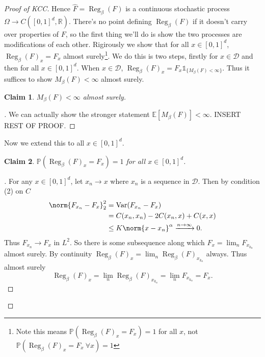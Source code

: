 \documentclass[fontsize=12pt, DIV=10]{scrreprt}
\newtheorem{claim}{Claim}
\theoremstyle{remark}
\newenvironment{subproof}[1][\proofname]{%
  \renewcommand{\qedsymbol}{$\blacksquare$}%
  \begin{proof}[#1]%
}{%
  \end{proof}%
}
\newcommand{\R}{\mathbb R}
\newcommand{\E}{\mathbb E}
\newcommand{\prob}{\mathbb P}
\newcommand{\indi}{\mathbb 1}
\newcommand{\calD}{\mathcal D}
\DeclareMathOperator{\reg}{Reg}
\DeclareMathOperator{\var}{Var}
\newcommand{\unitbox}{\ensuremath{[0,1]^d}}
\begin{document}
\begin{proof}[Proof of KCC]
	Hence $\hat{F} = \reg_{\beta}(F)$ is a continuous stochastic process $\Omega \to C(\unitbox, \R)$. There's no point defining $\reg_{\beta}(F)$ if it doesn't carry over properties of $F$, so the first thing we'll do is show the two processes are modifications of each other. Rigirously we show that for all $x \in [0, 1]^d$, $\reg_{\beta}(F)_x = F_x$ almost surely\footnote{Note this means $\prob(\reg_{\beta}(F)_x = F_x) = 1$ for all $x$, not $\prob(\reg_{\beta}(F)_x = F_x \ \forall x) = 1$}. We do this is two steps, firstly for $x \in \calD$ and then for all $x \in [0, 1]^d$. When $x \in \calD$, $\reg_{\beta}(F)_x = F_x \indi_{\{M_{\beta}(F) < \infty\}}$. Thus it suffices to show $M_{\beta}(F) < \infty$ almost surely.
	\begin{claim}
		$M_{\beta}(F) < \infty$ almost surely.
	\end{claim}
	\begin{subproof}
		We can actually show the stronger statement $\E[M_{\beta}(F)] < \infty$. INSERT REST OF PROOF.
	\end{subproof}
	
	Now we extend this to all $x \in \unitbox$.
	\begin{claim}
		$\prob(\reg_{\beta}(F)_x = F_x) = 1$ for all $x \in [0, 1]^d$.
	\end{claim}
	\begin{subproof}
		For any $x \in \unitbox$, let $x_n \to x$ where $x_n$ is a sequence in $\calD$. Then by condition (2) on $C$
		\begin{align}
			\norm{F_{x_n} - F_x}_2^2
			&= \var(F_{x_n} - F_x) \\
			&= C(x_n, x_n) - 2C(x_n, x) + C(x, x) \\
			&\leq K \norm{x - x_n}^{\alpha} \xrightarrow{n \to \infty} 0.
		\end{align}
		Thus $F_{x_n} \to F_x$ in $L^2$. So there is some subsequence along which $F_x = \lim_n F_{x_{k_n}}$ almost surely. By continuity $\reg_{\beta}(F)_x = \lim_n \reg_{\beta}(F)_{x_{k_n}}$ always. Thus almost surely
		\begin{equation}
			\reg_{\beta}(F)_x = \lim_n \reg_{\beta}(F)_{x_{k_n}}
			= \lim_n F_{x_{k_n}} = F_x.
		\end{equation}
	\end{subproof}


\end{proof}
\end{document}
